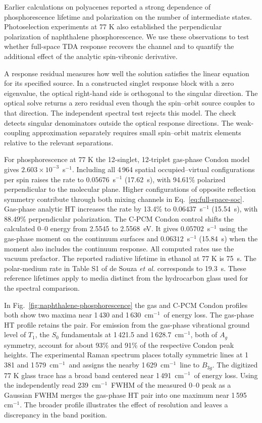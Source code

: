 \documentclass[11pt]{article}
\newcommand{\wn}{\ensuremath{\mathrm{cm}^{-1}}}
\begin{document}
Earlier calculations on polyacenes reported a strong dependence of phosphorescence lifetime and polarization on the number of intermediate states.\cite{pedash} Photoselection experiments at 77 K also established the perpendicular polarization of naphthalene phosphorescence.\cite{catalan} We use these observations to test whether full-space TDA response recovers the channel and to quantify the additional effect of the analytic spin-vibronic derivative.

A response residual measures how well the solution satisfies the linear equation for its specified source. In a constructed singlet response block with a zero eigenvalue, the optical right-hand side is orthogonal to the singular direction. The optical solve returns a zero residual even though the spin--orbit source couples to that direction. The independent spectral test rejects this model. The check detects singular denominators outside the optical response directions. The weak-coupling approximation separately requires small spin--orbit matrix elements relative to the relevant separations.

For phosphorescence at 77 K the 12-singlet, 12-triplet gas-phase Condon model gives $2.603\times10^{-3}$~s$^{-1}$. Including all 4\,964 spatial occupied--virtual configurations per spin raises the rate to $0.05676$~s$^{-1}$ (17.62~s), with 94.61\% polarized perpendicular to the molecular plane. Higher configurations of opposite reflection symmetry contribute through both mixing channels in Eq.~\eqref{eq:full-space-soc}. Gas-phase analytic HT increases the rate by 13.4\% to $0.06437$~s$^{-1}$ (15.54~s), with 88.49\% perpendicular polarization. The C-PCM Condon control shifts the calculated 0--0 energy from 2.5545 to 2.5568~eV. It gives $0.05702$~s$^{-1}$ using the gas-phase moment on the continuum surfaces and $0.06312$~s$^{-1}$ (15.84~s) when the moment also includes the continuum response. All computed rates use the vacuum prefactor. The reported radiative lifetime in ethanol at 77 K is 75~s.\cite{langelaar} The polar-medium rate in Table S1 of de Souza \emph{et al.} corresponds to 19.3~s.\cite{desouza-phosphorescence} These reference lifetimes apply to media distinct from the hydrocarbon glass used for the spectral comparison.

In Fig.~\ref{fig:naphthalene-phosphorescence} the gas and C-PCM Condon profiles both show two maxima near 1\,430 and 1\,630~\wn\ of energy loss. The gas-phase HT profile retains the pair. For emission from the gas-phase vibrational ground level of $T_1$, the $S_0$ fundamentals at 1\,421.5 and 1\,628.7~\wn, both of $A_g$ symmetry, account for about 93\% and 91\% of the respective Condon peak heights. The experimental Raman spectrum places totally symmetric lines at 1\,381 and 1\,579~\wn\ and assigns the nearby 1\,629~\wn\ line to $B_{3g}$.\cite{ohta-ito} The digitized 77 K glass trace has a broad band centered near 1\,491~\wn\ of energy loss. Using the independently read 239~\wn\ FWHM of the measured 0--0 peak as a Gaussian FWHM merges the gas-phase HT pair into one maximum near 1\,595~\wn. The broader profile illustrates the effect of resolution and leaves a discrepancy in the band position.
\end{document}
